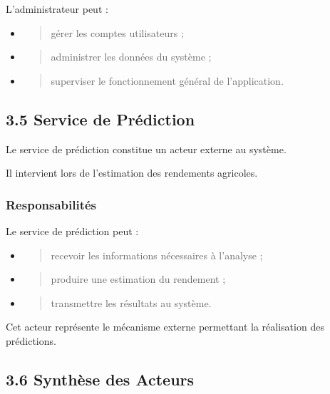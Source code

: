 \documentclass[
]{article}
\begin{document}
L'administrateur peut :

\begin{itemize}
\item
  \begin{quote}
  gérer les comptes utilisateurs ;
  \end{quote}
\item
  \begin{quote}
  administrer les données du système ;
  \end{quote}
\item
  \begin{quote}
  superviser le fonctionnement général de l'application.
  \end{quote}
\end{itemize}

\hypertarget{service-de-pruxe9diction}{%
\subsection{3.5 Service de Prédiction}\label{service-de-pruxe9diction}}

Le service de prédiction constitue un acteur externe au système.

Il intervient lors de l'estimation des rendements agricoles.

\hypertarget{responsabilituxe9s-3}{%
\subsubsection{Responsabilités}\label{responsabilituxe9s-3}}

Le service de prédiction peut :

\begin{itemize}
\item
  \begin{quote}
  recevoir les informations nécessaires à l'analyse ;
  \end{quote}
\item
  \begin{quote}
  produire une estimation du rendement ;
  \end{quote}
\item
  \begin{quote}
  transmettre les résultats au système.
  \end{quote}
\end{itemize}

Cet acteur représente le mécanisme externe permettant la réalisation des
prédictions.

\hypertarget{synthuxe8se-des-acteurs}{%
\subsection{3.6 Synthèse des Acteurs}\label{synthuxe8se-des-acteurs}}
\end{document}
